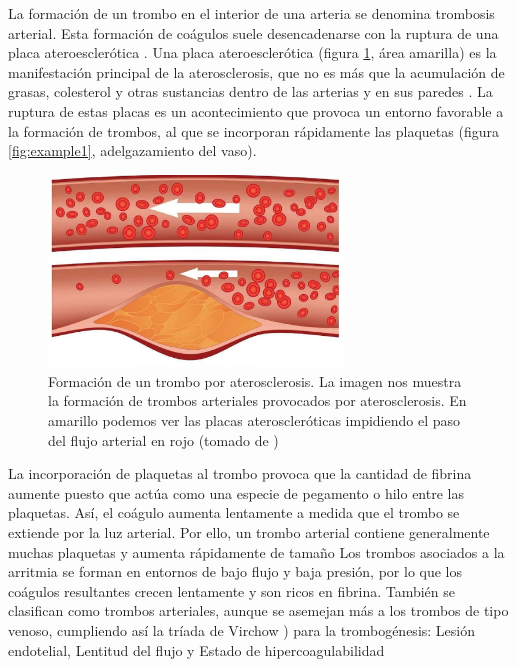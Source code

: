 
La formación de un trombo en el interior de una arteria se denomina trombosis arterial. Esta formación de coágulos suele desencadenarse con la ruptura de una placa ateroesclerótica \cite{Trombosis_Bayer}. Una placa ateroesclerótica (figura \ref{fig:Figura 1}, área amarilla) es la manifestación principal de la aterosclerosis, que no es más que la acumulación de grasas, colesterol y otras sustancias dentro de las arterias y en sus paredes \cite{Aterosclerosis_inflamacion}. La ruptura de estas placas es un acontecimiento que provoca un entorno favorable a la formación de trombos, al que se incorporan rápidamente las plaquetas (figura \ref{fig:example1}, adelgazamiento del vaso).

\begin{figure}[h]
    \centering
	\includegraphics[width=0.70\textwidth]{figures/aterosclerosis.jpg}
	\caption{Formación de un trombo por aterosclerosis. La imagen nos muestra la formación de trombos arteriales provocados por aterosclerosis. En amarillo podemos ver las placas ateroscleróticas impidiendo el paso del flujo arterial en rojo (tomado de \cite{imagen_trombo})}
	\label{fig:Figura 1}
  \end{figure}
  
La incorporación de plaquetas al trombo provoca que la cantidad de fibrina aumente puesto que actúa como una especie de pegamento o hilo entre las plaquetas. Así, el coágulo aumenta lentamente a medida que el trombo se extiende por la luz arterial. Por ello, un trombo arterial contiene generalmente muchas plaquetas y aumenta rápidamente de tamaño \cite{Aterosclerosis_inflamacion} \cite{Trombosis_Bayer}
Los trombos asociados a la arritmia se forman en entornos de bajo flujo y baja presión, por lo que los coágulos resultantes crecen lentamente y son ricos en fibrina. También se clasifican como trombos arteriales, aunque se asemejan más a los trombos de tipo venoso, cumpliendo así la tríada de Virchow \cite{Triada_Virchow}) para la trombogénesis: Lesión endotelial, Lentitud del flujo y Estado de hipercoagulabilidad
\\

